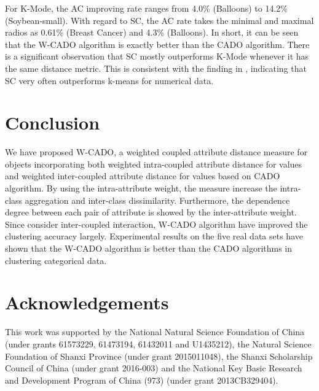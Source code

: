 \documentclass[review]{elsarticle}
\begin{document}
 For K-Mode, the AC improving rate ranges from 4.0\% (Balloons) to 14.2\% (Soybean-small). With regard to SC, the AC rate takes the minimal and maximal radios as 0.61\% (Breast Cancer) and 4.3\% (Balloons). In short, it can be seen that the W-CADO algorithm is exactly better than the CADO algorithm. There is a significant observation that SC mostly outperforms K-Mode whenever it has the same distance metric. This is consistent with the finding in \cite{UVon2007Tutorial}, indicating that SC very often outperforms k-means for numerical data.

\section{Conclusion}
We have proposed W-CADO, a weighted coupled attribute distance measure for objects incorporating both weighted intra-coupled attribute distance for values and weighted inter-coupled attribute distance for values based on CADO algorithm. By using the intra-attribute weight, the measure increase the intra-class aggregation and inter-class dissimilarity. Furthermore, the dependence degree between each pair of attribute is showed by the inter-attribute weight. Since consider inter-coupled interaction, W-CADO algorithm have improved the clustering accuracy largely. Experimental results on the five real data sets have shown that the W-CADO algorithm is better than the CADO algorithms in clustering categorical data.

\section*{Acknowledgements}

This work was supported by the National Natural Science Foundation of China (under grants 61573229, 61473194, 61432011 and U1435212), the Natural Science Foundation of Shanxi Province (under grant 2015011048), the Shanxi Scholarship Council of China (under grant 2016-003) and the National Key Basic Research and Development Program of China (973) (under grant 2013CB329404).
\end{document}
